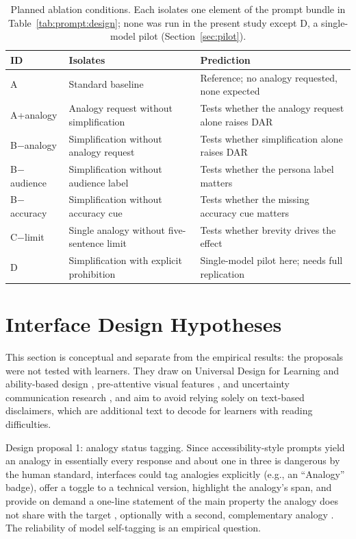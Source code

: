\documentclass[journal,article,submit,pdftex,moreauthors]{Definitions/mdpi}
\begin{document}
\begin{table}[H]
\caption{Planned ablation conditions. Each isolates one element of the prompt bundle in Table~\ref{tab:prompt:design}; none was run in the present study except D, a single-model pilot (Section~\ref{sec:pilot}).}
\label{tab:ablation:plan}
\centering
\small
\begin{tabularx}{\linewidth}{lXX}
\toprule
ID & Isolates & Prediction \\
\midrule
A & Standard baseline & Reference; no analogy requested, none expected \\
A+analogy & Analogy request without simplification & Tests whether the analogy request alone raises DAR \\
B$-$analogy & Simplification without analogy request & Tests whether simplification alone raises DAR \\
B$-$audience & Simplification without audience label & Tests whether the persona label matters \\
B$-$accuracy & Simplification without accuracy cue & Tests whether the missing accuracy cue matters \\
C$-$limit & Single analogy without five-sentence limit & Tests whether brevity drives the effect \\
D & Simplification with explicit prohibition & Single-model pilot here; needs full replication \\
\bottomrule
\end{tabularx}
\end{table}

\section{Interface Design Hypotheses}
\label{sec:design}

This section is conceptual and separate from the empirical results: the proposals were not tested with learners. They draw on Universal Design for Learning and ability-based design \cite{rose2002teaching, wobbrock2011ability}, pre-attentive visual features \cite{treisman1980feature}, and uncertainty communication research \cite{hullman2019pursuit}, and aim to avoid relying solely on text-based disclaimers, which are additional text to decode for learners with reading difficulties.

Design proposal 1: analogy status tagging. Since accessibility-style prompts yield an analogy in essentially every response and about one in three is dangerous by the human standard, interfaces could tag analogies explicitly (e.g., an ``Analogy'' badge), offer a toggle to a technical version, highlight the analogy's span, and provide on demand a one-line statement of the main property the analogy does not share with the target \cite{glynn1991explaining}, optionally with a second, complementary analogy \cite{spiro1989multiple}. The reliability of model self-tagging is an empirical question.
\end{document}
